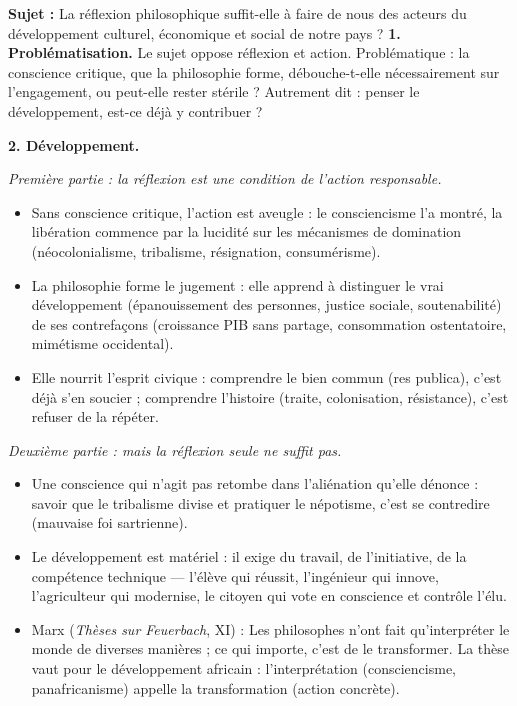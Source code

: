 \documentclass[11pt]{article}
\newcommand{\cle}[1]{{\popxbold\color{popdark}#1}}
\begin{document}
\begin{exoresolu}
\textbf{Sujet :} La réflexion philosophique suffit-elle à faire de nous des acteurs du développement culturel, économique et social de notre pays ?
\tcblower
\textbf{1. Problématisation.} Le sujet oppose \cle{réflexion} et \cle{action}. Problématique : la conscience critique, que la philosophie forme, débouche-t-elle nécessairement sur l'engagement, ou peut-elle rester stérile ? Autrement dit : penser le développement, est-ce déjà y contribuer ?

\textbf{2. Développement.}

\emph{Première partie : la réflexion est une condition de l'action responsable.}
\begin{itemize}
\item Sans conscience critique, l'action est aveugle : le consciencisme l'a montré, la libération commence par la lucidité sur les mécanismes de domination (néocolonialisme, tribalisme, résignation, consumérisme).
\item La philosophie forme le jugement : elle apprend à distinguer le vrai développement (épanouissement des personnes, justice sociale, soutenabilité) de ses contrefaçons (croissance PIB sans partage, consommation ostentatoire, mimétisme occidental).
\item Elle nourrit l'esprit civique : comprendre le bien commun (res publica), c'est déjà s'en soucier ; comprendre l'histoire (traite, colonisation, résistance), c'est refuser de la répéter.
\end{itemize}

\emph{Deuxième partie : mais la réflexion seule ne suffit pas.}
\begin{itemize}
\item Une conscience qui n'agit pas retombe dans l'aliénation qu'elle dénonce : savoir que le tribalisme divise et pratiquer le népotisme, c'est se contredire (mauvaise foi sartrienne).
\item Le développement est matériel : il exige du travail, de l'initiative, de la compétence technique — l'élève qui réussit, l'ingénieur qui innove, l'agriculteur qui modernise, le citoyen qui vote en conscience et contrôle l'élu.
\item Marx (\emph{Thèses sur Feuerbach}, XI) : \guillemotleft Les philosophes n'ont fait qu'interpréter le monde de diverses manières ; ce qui importe, c'est de le transformer. \guillemotright La thèse vaut pour le développement africain : l'interprétation (consciencisme, panafricanisme) appelle la transformation (action concrète).
\end{itemize}


\end{exoresolu}
\end{document}
